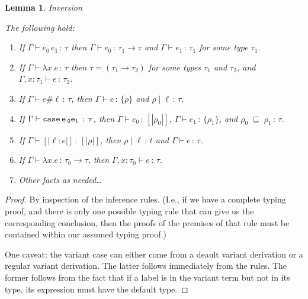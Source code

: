 \documentclass{article}
\newtheorem{lemma}{Lemma}
\newcommand{\variant}[1]{[\!|#1|\!]}
\newcommand{\case}[2]{\tt{case}\,#1\,#2}
\newcommand{\app}[2]{#1\,#2}
\newcommand{\lam}[2]{\lambda #1 . #2}
\newcommand{\hastp}[3]{#1 \vdash #2 \,:\, #3}
\newcommand{\haslbl}[3]{#1\;|\;#2\,:\, #3}
\newcommand{\caseVarRcd}[3]{#1 \;\sqsubseteq\; #2 \,:\, #3}
\begin{document}
\begin{lemma}{Inversion} \label{lem:inversion}

  The following hold:

  \mbox{}
\begin{enumerate}
\item If $\hastp{\Gamma}{\app{e_0}{e_1}}{\tau}$ then
  $\hastp{\Gamma}{e_0}{\tau_1\to\tau}$ and $\hastp{\Gamma}{e_1}{\tau_1}$ for some type $\tau_1$.
\item If $\hastp{\Gamma}{\lam{x}{e}}{\tau}$ then $\tau = (\tau_1\to\tau_2)$ for
some types $\tau_1$ and $\tau_2$, and
  $\hastp{\Gamma,x:\tau_1}{e}{\tau_2}$.
\item If \(\hastp \Gamma {e \# \ell} \tau\), then \(\hastp \Gamma e {\{\rho\}}\)
  and \(\haslbl \rho \ell \tau\).
\item If \(\hastp \Gamma {\case e_0 e_1} \tau\), then \(\hastp \Gamma {e_0}
  {\variant {\rho_0}}\), \(\hastp \Gamma {e_1} {\{\rho_1\}}\), and \(\caseVarRcd
  {\rho_0} {\rho_1} \tau\).
\item If \(\hastp \Gamma {\variant {\ell : e}} {\variant \rho}\), then \(\haslbl
  \rho \ell t\) and \(\hastp \Gamma e \tau\).
\item If \(\hastp \Gamma {\lambda x. e} {\tau_0 \to \tau}\), then \(\hastp
  {\Gamma, x : \tau_0} e \tau\).
\item Other facts as needed\ldots
\end{enumerate}
\end{lemma}

\begin{proof}
By inspection of the inference rules. (I.e., if we have a complete typing proof,
and there is only one possible typing rule that can give us the corresponding conclusion,
then the proofs of the premises of that rule must be contained within our assumed typing proof.)

One caveat: the variant case can either come from a deault variant derivation or
a regular variant derivation. The latter follows immediately from the rules. The
former follows from the fact that if a label is in the variant term but not in
its type, its expression must have the default type.


\end{proof}
\end{document}
